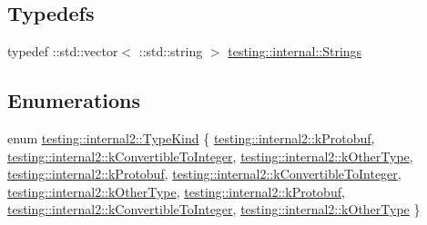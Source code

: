 \subsection*{Typedefs}
\begin{DoxyCompactItemize}
\item 
typedef \+::std\+::vector$<$ \+::std\+::string $>$ \mbox{\hyperlink{namespacetesting_1_1internal_a4ad7524c75dfadde584df6d5b4742aa8}{testing\+::internal\+::\+Strings}}
\end{DoxyCompactItemize}
\subsection*{Enumerations}
\begin{DoxyCompactItemize}
\item 
enum \mbox{\hyperlink{namespacetesting_1_1internal2_aeb8161b0b3ee503347b0662d7028fd57}{testing\+::internal2\+::\+Type\+Kind}} \{ \newline
\mbox{\hyperlink{namespacetesting_1_1internal2_aeb8161b0b3ee503347b0662d7028fd57ab6c394f7612d98d3a4a0514b2d6eb840}{testing\+::internal2\+::k\+Protobuf}}, 
\mbox{\hyperlink{namespacetesting_1_1internal2_aeb8161b0b3ee503347b0662d7028fd57a17045378f0cb6cac7737d414d39c720e}{testing\+::internal2\+::k\+Convertible\+To\+Integer}}, 
\mbox{\hyperlink{namespacetesting_1_1internal2_aeb8161b0b3ee503347b0662d7028fd57a36261578e764cf2fabfa058345c95016}{testing\+::internal2\+::k\+Other\+Type}}, 
\mbox{\hyperlink{namespacetesting_1_1internal2_aeb8161b0b3ee503347b0662d7028fd57ab6c394f7612d98d3a4a0514b2d6eb840}{testing\+::internal2\+::k\+Protobuf}}, 
\newline
\mbox{\hyperlink{namespacetesting_1_1internal2_aeb8161b0b3ee503347b0662d7028fd57a17045378f0cb6cac7737d414d39c720e}{testing\+::internal2\+::k\+Convertible\+To\+Integer}}, 
\mbox{\hyperlink{namespacetesting_1_1internal2_aeb8161b0b3ee503347b0662d7028fd57a36261578e764cf2fabfa058345c95016}{testing\+::internal2\+::k\+Other\+Type}}, 
\mbox{\hyperlink{namespacetesting_1_1internal2_aeb8161b0b3ee503347b0662d7028fd57ab6c394f7612d98d3a4a0514b2d6eb840}{testing\+::internal2\+::k\+Protobuf}}, 
\mbox{\hyperlink{namespacetesting_1_1internal2_aeb8161b0b3ee503347b0662d7028fd57a17045378f0cb6cac7737d414d39c720e}{testing\+::internal2\+::k\+Convertible\+To\+Integer}}, 
\newline
\mbox{\hyperlink{namespacetesting_1_1internal2_aeb8161b0b3ee503347b0662d7028fd57a36261578e764cf2fabfa058345c95016}{testing\+::internal2\+::k\+Other\+Type}}
 \}
\item 

\end{DoxyCompactItemize}

